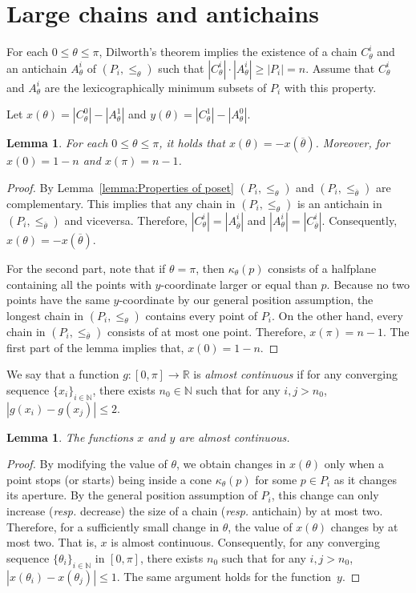 \documentclass[a4paper, 11pt]{article}
\newtheorem{lemma}[theorem]{Lemma}
\newcommand{\we}{{\ensuremath{\theta}}}
\newcommand{\nwe}{{\ensuremath{\overline{\theta}}}}
\newcommand{\cone}[1]{\ensuremath{\kappa_{\we}(#1)}}
\newcommand{\lt}{\ensuremath{ \leq_{\theta}}}
\newcommand{\ltc}{\ensuremath{ \leq_{\nwe}}}
\begin{document}
\section{Large chains and antichains}
For each $0\leq \theta \leq \pi$, Dilworth's theorem implies the existence of a chain $C^i_{\we}$ and an antichain $A^i_{\we}$ of $(P_i, \lt)$ such that  $|C^i_{\we}|\cdot |A^i_{\we}| \geq |P_i| = n$.
Assume that $C^i_{\we}$ and $A^i_{\we}$ are the lexicographically minimum subsets of $P_i$ with this property. 

Let $x(\we) = |C^0_{\we}| - |A^1_{\we}|$ and $y(\we) = |C^1_{\we}|- |A^0_{\we}|$.

\begin{lemma}\label{lemma:Properties of x}
For each $0\leq \theta \leq \pi$, it holds that $x(\theta) = -x(\nwe)$.
Moreover, for $x(0) = 1-n$ and $x(\pi) = n-1$.
\end{lemma}
\begin{proof}
By Lemma~\ref{lemma:Properties of poset} $(P_i, \lt)$ and $(P_i, \ltc)$ are complementary. 
This implies that any chain in $(P_i, \lt)$ is an antichain in $(P_i, \ltc)$ and viceversa. 
Therefore, $|C^i_{\we}| = |A^i_{\nwe}|$ and $|A^i_{\we}| = |C^i_{\nwe}|$.
Consequently, $x(\we) = -x(\nwe)$.

For the second part, note that if $\theta = \pi$, then $\cone{p}$ consists of a halfplane containing all the points with $y$-coordinate larger or equal than $p$. 
Because no two points have the same $y$-coordinate by our general position assumption, the longest chain in $(P_i, \lt)$ contains every point of $P_i$.
On the other hand, every chain in $(P_i, \ltc)$ consists of at most one point.
Therefore, $x(\pi) = n-1$. 
The first part of the lemma implies that, $x(0) = 1-n$.
\end{proof}

We say that a function $g:[0,\pi]\to \mathbb{R}$ is \emph{almost continuous} if 
for any converging sequence $\{x_i\}_{i\in \mathbb{N}}$, 
there exists $n_0\in \mathbb{N}$ such that for any $i,j>n_0$, $|g(x_i) - g(x_j)|\leq 2$.

\begin{lemma}\label{lemma:Almost continuous}
The functions $x$ and $y$ are almost continuous.
\end{lemma}
\begin{proof}
By modifying the value of $\we$, we obtain changes in $x(\we)$ only when a point stops (or starts) being inside a cone $\cone{p}$ for some $p\in P_i$ as it changes its aperture.
By the general position assumption of $P_i$, this change can only increase (\emph{resp.} decrease) the size of a chain (\emph{resp.} antichain) by at most two.
Therefore, for a sufficiently small change in $\we$, the value of $x(\we)$ changes by at most two. That is, $x$ is almost continuous.
Consequently, for any converging sequence $\{\we_i\}_{i\in \mathbb{N}}$ in $[0, \pi]$, 
there exists $n_0$ such that for any $i,j>n_0$, $|x(\we_i) - x(\we_j)| \leq 1$. 
The same argument holds for the function~$y$.
\end{proof}
\end{document}
